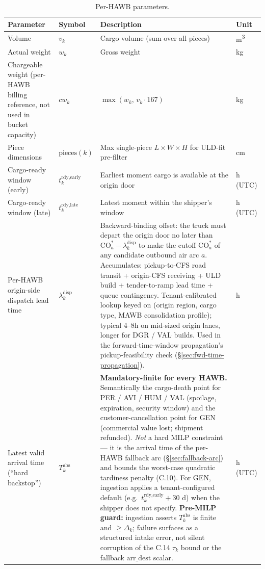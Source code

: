 \documentclass[11pt,a4paper]{article}
\theoremstyle{definition}
\begin{document}
\begin{table}[H]
\centering
\caption{Per-HAWB parameters.}
\label{tab:hawb-params}
\begin{tabular}{p{3.5cm}p{2.2cm}p{6.5cm}p{1.5cm}}
\toprule
Parameter & Symbol & Description & Unit \\
\midrule
Volume & $v_k$ & Cargo volume (sum over all pieces) & m\textsuperscript{3} \\
Actual weight & $w_k$ & Gross weight & kg \\
Chargeable weight (per-HAWB billing reference, not used in bucket capacity) & $cw_k$ & $\max(w_k,\, v_k \cdot 167)$ & kg \\
Piece dimensions & $\text{pieces}(k)$ & Max single-piece $L \times W \times H$ for ULD-fit pre-filter & cm \\
Cargo-ready window (early) & $t_k^{\text{rdy,early}}$ & Earliest moment cargo is available at the origin door & h (UTC) \\
Cargo-ready window (late) & $t_k^{\text{rdy,late}}$ & Latest moment within the shipper's window & h (UTC) \\
Per-HAWB origin-side dispatch lead time & $\lambda^{\text{disp}}_k$ & Backward-binding offset: the truck must depart the origin door no later than $\text{CO}_a^* - \lambda^{\text{disp}}_k$ to make the cutoff $\text{CO}_a^*$ of any candidate outbound air arc $a$. Accumulates: pickup-to-CFS road transit + origin-CFS receiving + ULD build + tender-to-ramp lead time + queue contingency. Tenant-calibrated lookup keyed on (origin region, cargo type, MAWB consolidation profile); typical 4--8h on mid-sized origin lanes, longer for DGR / VAL builds. Used in the forward-time-window propagation's pickup-feasibility check (\S\ref{sec:fwd-time-propagation}). & h \\
Latest valid arrival time (``hard backstop'') & $T_k^{\text{abs}}$ & \textbf{Mandatory-finite for every HAWB.} Semantically the cargo-death point for PER / AVI / HUM / VAL (spoilage, expiration, security window) and the customer-cancellation point for GEN (commercial value lost; shipment refunded). \emph{Not} a hard MILP constraint --- it is the arrival time of the per-HAWB fallback arc (\S\ref{sec:fallback-arc}) and bounds the worst-case quadratic tardiness penalty (C.10). For GEN, ingestion applies a tenant-configured default (e.g.\ $t_k^{\text{rdy,early}} + 30$ d) when the shipper does not specify. \textbf{Pre-MILP guard:} ingestion asserts $T_k^{\text{abs}}$ is finite and $\geq \Delta_k$; failure surfaces as a structured intake error, not silent corruption of the C.14 $\tau_k$ bound or the fallback $\text{arr\_dest}$ scalar. & h (UTC) \\

\end{tabular}
\end{table}
\end{document}
